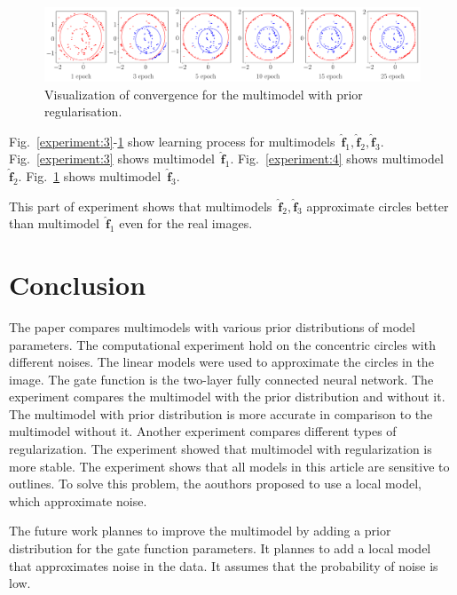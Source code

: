 \documentclass[12pt, twoside]{article}
\numberwithin{equation}{section}
\begin{document}
\begin{figure}[h!t]\center
\includegraphics[width=1\textwidth]{result_eng/experiment_real_regular}
\caption{Visualization of convergence for the multimodel with prior regularisation.}
\label{experiment:5}
\end{figure}

Fig.~\ref{experiment:3}-\ref{experiment:5} show learning process for multimodels~$\hat{\mathbf{f}}_1, \hat{\mathbf{f}}_2, \hat{\mathbf{f}}_3$.
Fig.~\ref{experiment:3} shows multimodel~$\hat{\mathbf{f}}_1$.
Fig.~\ref{experiment:4} shows multimodel~$\hat{\mathbf{f}}_2$.
Fig.~\ref{experiment:5} shows multimodel~$\hat{\mathbf{f}}_3$.

This part of experiment shows that multimodels~$\hat{\mathbf{f}}_2, \hat{\mathbf{f}}_3$ approximate circles better than multimodel~$\hat{\mathbf{f}}_1$ even for the real images.


\section{Conclusion}
The paper compares multimodels with various prior distributions of model parameters. 
The computational experiment hold on the concentric circles with different noises.
The linear models were used to approximate the circles in the image. The gate function is the two-layer fully connected neural network.
The experiment compares the multimodel with the prior distribution and without it. The multimodel with prior distribution is more accurate in comparison to the multimodel without it.
Another experiment compares different types of regularization. The experiment showed that multimodel with regularization is more stable.
The experiment shows that all models in this article are sensitive to outlines. To solve this problem, the aouthors proposed to use a local model, which approximate noise. 

The future work plannes to improve the multimodel by adding a prior distribution for the gate function parameters. It plannes to add a local model that approximates noise in the data. It assumes that the probability of noise is low.
\end{document}
